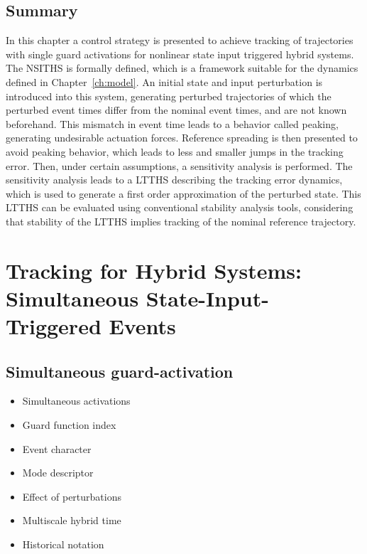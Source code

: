 \documentclass[../DC2017114Bouma.tex]{subfiles}
\begin{document}
\section{Summary}
In this chapter a control strategy is presented to achieve tracking of trajectories with single guard activations for nonlinear state input triggered hybrid systems. The NSITHS is formally defined, which is a framework suitable for the dynamics defined in Chapter~\ref{ch:model}. An initial state and input perturbation is introduced into this system, generating perturbed trajectories of which the perturbed event times differ from the nominal event times, and are not known beforehand. This mismatch in event time leads to a behavior called peaking, generating undesirable actuation forces. Reference spreading is then presented to avoid peaking behavior, which leads to less and smaller jumps in the tracking error. Then, under certain assumptions, a sensitivity analysis is performed. The sensitivity analysis leads to a LTTHS describing the tracking error dynamics, which is used to generate a first order approximation of the perturbed state. This LTTHS can be evaluated using conventional stability analysis tools, considering that stability of the LTTHS implies tracking of the nominal reference trajectory.
\cleartooddpage
\chapter{Tracking for Hybrid Systems: Simultaneous State-Input-Triggered Events}\label{ch:simult}
\cite{Rijnen2018}
\section{Simultaneous guard-activation}
\begin{itemize}
\item Simultaneous activations
\item Guard function index
\item Event character
\item Mode descriptor
\item Effect of perturbations
\item Multiscale hybrid time
\item Historical notation
\end{itemize}
%
%
%
%
%
%
%
%
%
\end{document}
